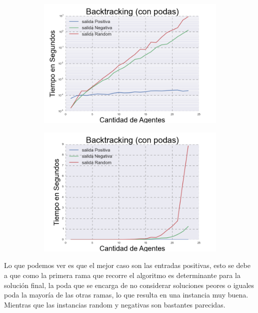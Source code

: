\begin{figure}[h]
\begin{subfigure}{0.5\textwidth}
\includegraphics[scale=0.45]{BacktrackingPodasLog.png}
\end{subfigure}
\begin{subfigure}{0.5\textwidth}
\includegraphics[scale=0.45]{BacktrackingPodas.png}
\end{subfigure}

\end{figure}

	Lo que podemos ver es que el mejor caso son las entradas positivas, esto se debe a que como la primera rama que recorre el algoritmo es determinante para la solución final, la poda que se encarga de no considerar soluciones peores o iguales poda la mayoría de las otras ramas, lo que resulta en una instancia muy buena. Mientras que las instancias random y negativas son bastantes parecidas. 
	
